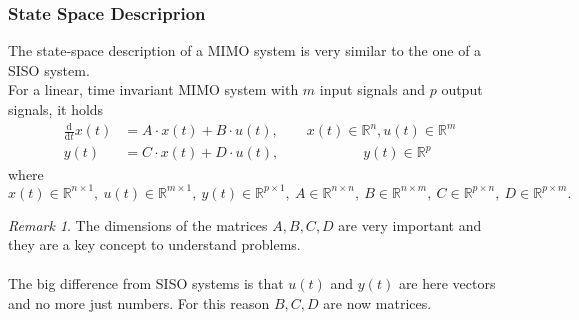 \documentclass[a4paper,12 pt]{article}
\numberwithin{equation}{section}
\theoremstyle{definition}
\theoremstyle{remark}
\newtheorem*{bmk}{Remark}
\theoremstyle{definition}
\theoremstyle{definition}
\theoremstyle{definition}
\theoremstyle{remark}
\newcommand{\dd}[2]{\frac{\text{d}#1}{\text{d}#2}}
\begin{document}
\subsubsection{State Space Descriprion}
The state-space description of a MIMO system is very similar to the one of a SISO system. \\ For a linear, time invariant MIMO system with $m$ input signals and $p$ output signals, it holds
\begin{equation}
 \begin{split}
 \dd{}{t} x(t) &= A \cdot x(t) + B \cdot u(t), \qquad x(t) \in \mathbb{R}^n, u(t) \in \mathbb{R}^m \\
 y(t) &= C \cdot x(t) + D \cdot u(t), \qquad \qquad \qquad y(t) \in \mathbb{R}^p
 \end{split}
 \label{eqMIMOstatespace}
 \end{equation}
where
\begin{equation} 
x(t) \in \mathbb{R}^{n\times 1},\ u(t) \in \mathbb{R}^{m\times 1},\ y(t) \in \mathbb{R}^{p\times 1},\ A \in \mathbb{R}^{n\times n}, \ B \in \mathbb{R}^{n\times m}, \ C \in \mathbb{R}^{p\times n}, \ D \in \mathbb{R}^{p\times m}.
\end{equation}
\begin{bmk}
The dimensions of the matrices $A,B,C,D$ are very important and they are a key concept to understand problems. \\ \\
The big difference from SISO systems is that $u(t)$ and $y(t)$ are here vectors and no more just numbers. For this reason $B,C,D$ are now matrices.
\end{bmk}
\end{document}
